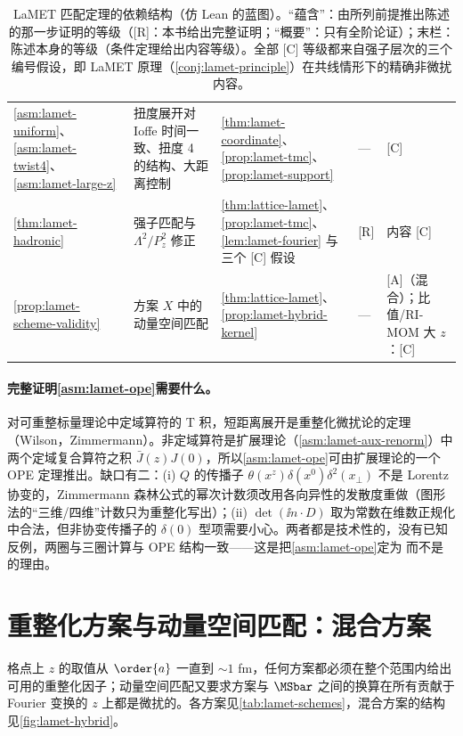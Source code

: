 \begin{table}[htbp]
\begin{tabularx}{\textwidth}{@{}p{2.25cm}Xp{3.6cm}p{0.95cm}p{1.75cm}@{}}
\cref{asm:lamet-uniform}、\cref{asm:lamet-twist4}、\cref{asm:lamet-large-z} & 扭度展开对 Ioffe 时间一致、扭度 4 的结构、大距离控制 & \cref{thm:lamet-coordinate}、\cref{prop:lamet-tmc}、\cref{prop:lamet-support} & — & [C] \\
\cref{thm:lamet-hadronic} & 强子匹配与 $\Lambda^2/P_z^2$ 修正 & \cref{thm:lattice-lamet}、\cref{prop:lamet-tmc}、\cref{lem:lamet-fourier} 与三个 [C] 假设 & [R] & 内容 [C] \\
\cref{prop:lamet-scheme-validity} & 方案 $X$ 中的动量空间匹配 & \cref{thm:lattice-lamet}、\cref{prop:lamet-hybrid-kernel} & — & [A]（混合）；比值/RI-MOM 大 $z$：[C] \\
\bottomrule
\end{tabularx}
\caption{LaMET 匹配定理的依赖结构（仿 Lean 的蓝图）。“蕴含”：由所列前提推出陈述的那一步证明的等级（[R]：本书给出完整证明；“概要”：只有全阶论证）；末栏：陈述本身的等级（条件定理给出内容等级）。全部 [C] 等级都来自强子层次的三个编号假设，即 LaMET 原理（\cref{conj:lamet-principle}）在共线情形下的精确非微扰内容。}
\label{tab:lamet-dependency}
\end{table}

\paragraph{完整证明\cref{asm:lamet-ope}需要什么。}
对可重整标量理论中定域算符的 T 积，短距离展开是重整化微扰论的定理（Wilson\cite{Wilson1969}，Zimmermann\cite{Zimmermann1973}）。非定域算符是扩展理论（\cref{asm:lamet-aux-renorm}）中两个定域复合算符之积 $\bar J(z)J(0)$，所以\cref{asm:lamet-ope}可由扩展理论的一个 OPE 定理推出。缺口有二：(i) $Q$ 的传播子 $\theta(x^z)\delta(x^0)\delta^2(x_\perp)$ 不是 Lorentz 协变的，Zimmermann 森林公式的幂次计数须改用各向异性的发散度重做（图形法的“三维/四维”计数只为重整化写出）；(ii) $\det(\ii n\cdot D)$ 取为常数在维数正规化中合法，但非协变传播子的 $\delta(0)$ 型项需要小心。两者都是技术性的，没有已知反例，两圈与三圈计算与 OPE 结构一致——这是把\cref{asm:lamet-ope}定为 \tagA 而不是 \tagC 的理由。

\section{重整化方案与动量空间匹配：混合方案}\label{sec:lamet-schemes}

格点上 $z$ 的取值从 $\order{a}$ 一直到 $\sim1$ fm，任何方案都必须在整个范围内给出可用的重整化因子；动量空间匹配又要求方案与 $\MSbar$ 之间的换算在所有贡献于 Fourier 变换的 $z$ 上都是微扰的。各方案见\cref{tab:lamet-schemes}，混合方案的结构见\cref{fig:lamet-hybrid}。


